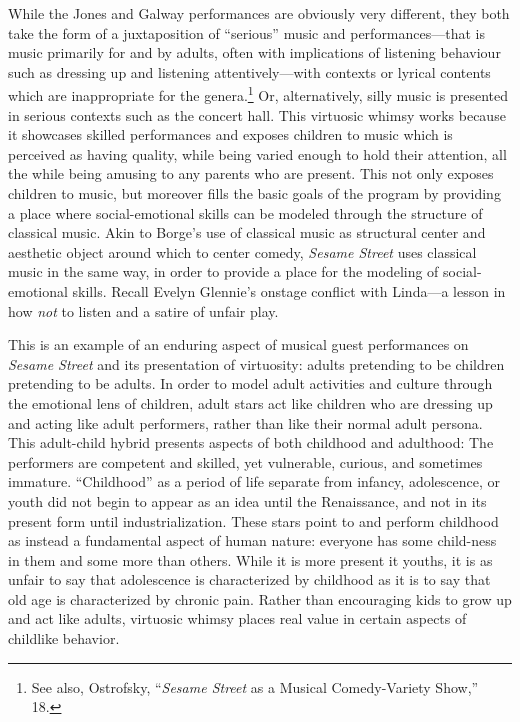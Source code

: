 \documentclass[12pt,letterpaper]{article}
\newcommand{\ses}{\textit{Sesame Street }}
\begin{document}
        While the Jones and Galway performances are obviously very different, 
	they both take the form of a juxtaposition of ``serious'' music and 
	performances---that is music primarily for and by adults, often with
	implications of listening behaviour such as dressing up and listening 
	attentively---with contexts or lyrical contents which are inappropriate 
	for the genera.\footnote{See also, Ostrofsky,  ``\textit{Sesame Street}
	as a Musical Comedy-Variety Show,'' 18.} Or, alternatively, silly music
	is presented in serious contexts such as the concert hall. This 
	virtuosic whimsy 
	works because it showcases skilled performances and exposes children to
	music which is perceived as having quality, while being varied enough 
	to hold their attention, all the while being amusing to any parents who 
	are present. This not only exposes children to music, but moreover fills
	the basic goals of the program by providing a place where 
	social-emotional skills can be modeled through the structure of
	classical music. Akin to Borge's use of classical music as structural
	center and aesthetic object around which to center comedy, \ses 
	uses classical music in the same way, in order to provide a place for
	the modeling of social-emotional skills. Recall Evelyn Glennie's 
	onstage conflict with Linda---a lesson in how \textit{not} to listen
	and a satire of unfair play. 

	This is an example of an enduring aspect of musical guest performances
	on \textit{Sesame Street} and its presentation of virtuosity: adults 
	pretending to be children pretending
	to be adults. In order to model adult activities and culture through the
	emotional lens of children, adult stars act like children who are 
	dressing up and acting like adult performers, rather than like their
	normal adult persona. This adult-child hybrid 
	presents aspects of both childhood and adulthood: The performers are 
	competent and skilled, yet vulnerable, curious, and sometimes immature.  
	``Childhood'' as a period of life separate from infancy, adolescence, 
	or youth did not begin to appear as an idea until the Renaissance, and
	not in its present form until industrialization.\autocite[13]{Illich}
	These stars point to and perform childhood as instead a fundamental 
	aspect of human nature: everyone has some child-ness in them and some
	more than others. While it is more present it youths, it is as unfair
	to say that adolescence is characterized by childhood as it is to say
	that old age is characterized by chronic pain. Rather than encouraging
	kids to grow up and act like adults, virtuosic whimsy places real value
	in certain aspects of childlike behavior.
\end{document}

